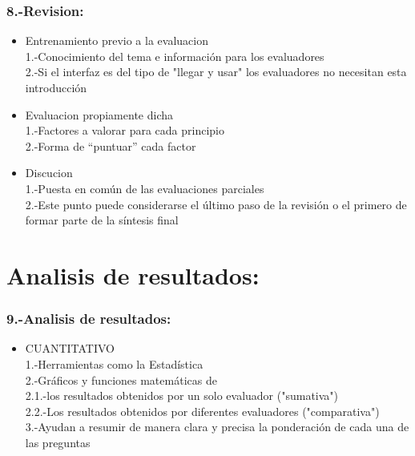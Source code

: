 \documentclass[11pt]{beamer}
\begin{document}
\begin{frame}
\frametitle{8.-Revision:}

\begin{itemize}
\item Entrenamiento previo a la evaluacion\\ 1.-Conocimiento del tema e información para los evaluadores\\ 2.-Si el interfaz es del tipo de "llegar y usar" los evaluadores no necesitan esta introducción
\item Evaluacion propiamente dicha\\1.-Factores a valorar para cada principio \\2.-Forma de “puntuar” cada factor
\item Discucion\\ 1.-Puesta en común de las evaluaciones parciales \\ 2.-Este punto puede considerarse el último paso de la revisión o el primero de formar parte de la síntesis final
\end{itemize}

\end{frame}

\section{Analisis de resultados:}
\begin{frame}
\frametitle{9.-Analisis de resultados:}

\begin{itemize}
\item CUANTITATIVO\\ 1.-Herramientas como la Estadística\\ 2.-Gráficos y funciones matemáticas de \\ 2.1.-los resultados obtenidos por un solo evaluador ("sumativa")\\ 2.2.-Los resultados obtenidos por diferentes evaluadores ("comparativa")\\ 3.-Ayudan a resumir de manera clara y precisa la ponderación de cada una de las preguntas 
\end{itemize}

\end{frame}
\end{document}
